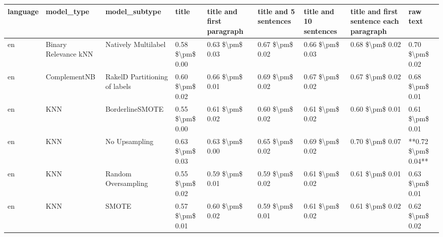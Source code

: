 \begin{tabular}{lllllllll}
\toprule
language &                      model\_type &                 model\_subtype &           title & title and first paragraph & title and 5 sentences & title and 10 sentences & title and first sentence each paragraph &            raw text \\
\midrule
      en &            Binary Relevance kNN &           Natively Multilabel & 0.58 \$\textbackslash pm\$ 0.00 &           0.63 \$\textbackslash pm\$ 0.03 &       0.67 \$\textbackslash pm\$ 0.02 &        0.66 \$\textbackslash pm\$ 0.03 &                         0.68 \$\textbackslash pm\$ 0.02 &     0.70 \$\textbackslash pm\$ 0.02 \\
      en &                    ComplementNB & RakelD Partitioning of labels & 0.60 \$\textbackslash pm\$ 0.02 &           0.66 \$\textbackslash pm\$ 0.01 &       0.69 \$\textbackslash pm\$ 0.02 &        0.67 \$\textbackslash pm\$ 0.02 &                         0.67 \$\textbackslash pm\$ 0.02 &     0.68 \$\textbackslash pm\$ 0.01 \\
      en &                             KNN &               BorderlineSMOTE & 0.55 \$\textbackslash pm\$ 0.00 &           0.61 \$\textbackslash pm\$ 0.02 &       0.60 \$\textbackslash pm\$ 0.02 &        0.61 \$\textbackslash pm\$ 0.02 &                         0.60 \$\textbackslash pm\$ 0.01 &     0.61 \$\textbackslash pm\$ 0.01 \\
      en &                             KNN &                 No Upsampling & 0.63 \$\textbackslash pm\$ 0.03 &           0.63 \$\textbackslash pm\$ 0.00 &       0.65 \$\textbackslash pm\$ 0.02 &        0.69 \$\textbackslash pm\$ 0.02 &                         0.70 \$\textbackslash pm\$ 0.07 & **0.72 \$\textbackslash pm\$ 0.04** \\
      en &                             KNN &           Random Oversampling & 0.55 \$\textbackslash pm\$ 0.02 &           0.59 \$\textbackslash pm\$ 0.01 &       0.59 \$\textbackslash pm\$ 0.02 &        0.61 \$\textbackslash pm\$ 0.02 &                         0.61 \$\textbackslash pm\$ 0.01 &     0.63 \$\textbackslash pm\$ 0.01 \\
      en &                             KNN &                         SMOTE & 0.57 \$\textbackslash pm\$ 0.01 &           0.60 \$\textbackslash pm\$ 0.02 &       0.59 \$\textbackslash pm\$ 0.01 &        0.61 \$\textbackslash pm\$ 0.02 &                         0.61 \$\textbackslash pm\$ 0.02 &     0.62 \$\textbackslash pm\$ 0.02 \\

\end{tabular}

